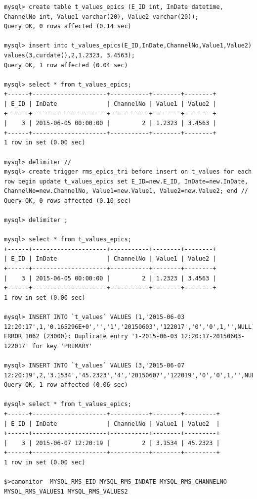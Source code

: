 \documentclass[11pt
  , a4paper
  , article
  , oneside
]{memoir}
\begin{document}
\begin{lstlisting}[style=termstyle]
mysql> create table t_values_epics (E_ID int, InDate datetime, ChannelNo int, Value1 varchar(20), Value2 varchar(20));
Query OK, 0 rows affected (0.14 sec)

mysql> insert into t_values_epics(E_ID,InDate,ChannelNo,Value1,Value2) values(3,curdate(),2,1.2323, 3.4563);
Query OK, 1 row affected (0.04 sec)

mysql> select * from t_values_epics;
+------+---------------------+-----------+--------+--------+
| E_ID | InDate              | ChannelNo | Value1 | Value2 |
+------+---------------------+-----------+--------+--------+
|    3 | 2015-06-05 00:00:00 |         2 | 1.2323 | 3.4563 |
+------+---------------------+-----------+--------+--------+
1 row in set (0.00 sec)

mysql> delimiter //
mysql> create trigger rms_epics_tri before insert on t_values for each row begin update t_values_epics set E_ID=new.E_ID, InDate=new.InDate, ChannelNo=new.ChannelNo, Value1=new.Value1, Value2=new.Value2; end //
Query OK, 0 rows affected (0.10 sec)

mysql> delimiter ;

mysql> select * from t_values_epics;
+------+---------------------+-----------+--------+--------+
| E_ID | InDate              | ChannelNo | Value1 | Value2 |
+------+---------------------+-----------+--------+--------+
|    3 | 2015-06-05 00:00:00 |         2 | 1.2323 | 3.4563 |
+------+---------------------+-----------+--------+--------+
1 row in set (0.00 sec)

mysql> INSERT INTO `t_values` VALUES (1,'2015-06-03 12:20:17',1,'0.165296E+0','','1','20150603','122017','0','0',1,'',NULL);
ERROR 1062 (23000): Duplicate entry '1-2015-06-03 12:20:17-20150603-122017' for key 'PRIMARY'

mysql> INSERT INTO `t_values` VALUES (3,'2015-06-07 12:20:19',2,'3.1534','45.2323','4','20150607','122019','0','0',1,'',NULL);
Query OK, 1 row affected (0.06 sec)

mysql> select * from t_values_epics;
+------+---------------------+-----------+--------+---------+
| E_ID | InDate              | ChannelNo | Value1 | Value2  |
+------+---------------------+-----------+--------+---------+
|    3 | 2015-06-07 12:20:19 |         2 | 3.1534 | 45.2323 |
+------+---------------------+-----------+--------+---------+
1 row in set (0.00 sec)

$>camonitor  MYSQL_RMS_EID MYSQL_RMS_INDATE MYSQL_RMS_CHANNELNO MYSQL_RMS_VALUES1 MYSQL_RMS_VALUES2


\end{lstlisting}
\end{document}
